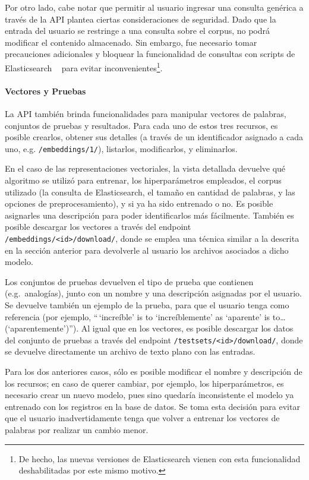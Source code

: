 Por otro lado, cabe notar que permitir al usuario ingresar una consulta genérica a través de la API
plantea ciertas consideraciones de seguridad. Dado que la entrada del usuario se restringe a una
consulta sobre el corpus, no podrá modificar el contenido almacenado. Sin embargo, fue necesario
tomar precauciones adicionales y bloquear la funcionalidad de consultas con scripts de Elasticsearch
~\cite{ElasticsearchScripting} para evitar inconvenientes\footnote{De hecho, las nuevas versiones de
Elasticsearch vienen con esta funcionalidad deshabilitadas por este mismo motivo.}.


\paragraph{Vectores y Pruebas}

La API también brinda funcionalidades para manipular vectores de palabras, conjuntos de pruebas y
resultados. Para cada uno de estos tres recursos, es posible crearlos, obtener sus detalles (a
través de un identificador asignado a cada uno, e.g. \texttt{/embeddings/1/}), listarlos,
modificarlos, y eliminarlos.

En el caso de las representaciones vectoriales, la vista detallada devuelve qué algoritmo se utilizó
para entrenar, los hiperparámetros empleados, el corpus utilizado (la consulta de Elasticsearch, el
tamaño en cantidad de palabras, y las opciones de preprocesamiento), y si ya ha sido entrenado o
no. Es posible asignarles una descripción para poder identificarlos más fácilmente. También es
posible descargar los vectores a través del endpoint \texttt{/embeddings/<id>/download/}, donde se
emplea una técnica similar a la descrita en la sección anterior para devolverle al usuario los
archivos asociados a dicho modelo.

Los conjuntos de pruebas devuelven el tipo de prueba que contienen (e.g.\ analogías), junto con un
nombre y una descripción asignadas por el usuario. Se devuelve también un ejemplo de la prueba, para
que el usuario tenga como referencia (por ejemplo, ``\,`increíble' is to `increíblemente' as
`aparente' is to\ldots (`aparentemente')''). Al igual que en los vectores, es posible descargar los
datos del conjunto de pruebas a través del endpoint \texttt{/testsets/<id>/download/}, donde se
devuelve directamente un archivo de texto plano con las entradas.

Para los dos anteriores casos, sólo es posible modificar el nombre y descripción de los recursos; en
caso de querer cambiar, por ejemplo, los hiperparámetros, es necesario crear un nuevo modelo, pues
sino quedaría inconsistente el modelo ya entrenado con los registros en la base de datos. Se toma
esta decisión para evitar que el usuario inadvertidamente tenga que volver a entrenar los vectores
de palabras por realizar un cambio menor.

